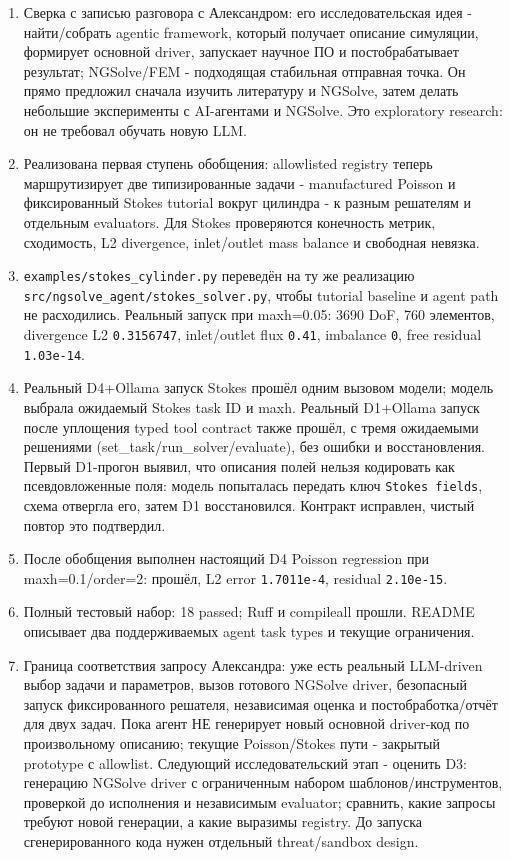 \documentclass[11pt,a4paper]{article}
\begin{document}
\begin{enumerate}
    \item Сверка с записью разговора с Александром: его исследовательская идея - найти/собрать agentic framework, который получает описание симуляции, формирует основной driver, запускает научное ПО и постобрабатывает результат; NGSolve/FEM - подходящая стабильная отправная точка. Он прямо предложил сначала изучить литературу и NGSolve, затем делать небольшие эксперименты с AI-агентами и NGSolve. Это exploratory research: он не требовал обучать новую LLM.
    \item Реализована первая ступень обобщения: allowlisted registry теперь маршрутизирует две типизированные задачи - manufactured Poisson и фиксированный Stokes tutorial вокруг цилиндра - к разным решателям и отдельным evaluators. Для Stokes проверяются конечность метрик, сходимость, L2 divergence, inlet/outlet mass balance и свободная невязка.
    \item \texttt{examples/stokes\_cylinder.py} переведён на ту же реализацию \texttt{src/ngsolve\_agent/stokes\_solver.py}, чтобы tutorial baseline и agent path не расходились. Реальный запуск при maxh=0.05: 3690 DoF, 760 элементов, divergence L2 \texttt{0.3156747}, inlet/outlet flux \texttt{0.41}, imbalance \texttt{0}, free residual \texttt{1.03e-14}.
    \item Реальный D4+Ollama запуск Stokes прошёл одним вызовом модели; модель выбрала ожидаемый Stokes task ID и maxh. Реальный D1+Ollama запуск после уплощения typed tool contract также прошёл, с тремя ожидаемыми решениями (set\_task/run\_solver/evaluate), без ошибки и восстановления. Первый D1-прогон выявил, что описания полей нельзя кодировать как псевдовложенные поля: модель попыталась передать ключ \texttt{Stokes fields}, схема отвергла его, затем D1 восстановился. Контракт исправлен, чистый повтор это подтвердил.
    \item После обобщения выполнен настоящий D4 Poisson regression при maxh=0.1/order=2: прошёл, L2 error \texttt{1.7011e-4}, residual \texttt{2.10e-15}.
    \item Полный тестовый набор: 18 passed; Ruff и compileall прошли. README описывает два поддерживаемых agent task types и текущие ограничения.
    \item Граница соответствия запросу Александра: уже есть реальный LLM-driven выбор задачи и параметров, вызов готового NGSolve driver, безопасный запуск фиксированного решателя, независимая оценка и постобработка/отчёт для двух задач. Пока агент НЕ генерирует новый основной driver-код по произвольному описанию; текущие Poisson/Stokes пути - закрытый prototype с allowlist. Следующий исследовательский этап - оценить D3: генерацию NGSolve driver с ограниченным набором шаблонов/инструментов, проверкой до исполнения и независимым evaluator; сравнить, какие запросы требуют новой генерации, а какие выразимы registry. До запуска сгенерированного кода нужен отдельный threat/sandbox design.
\end{enumerate}
\end{document}
